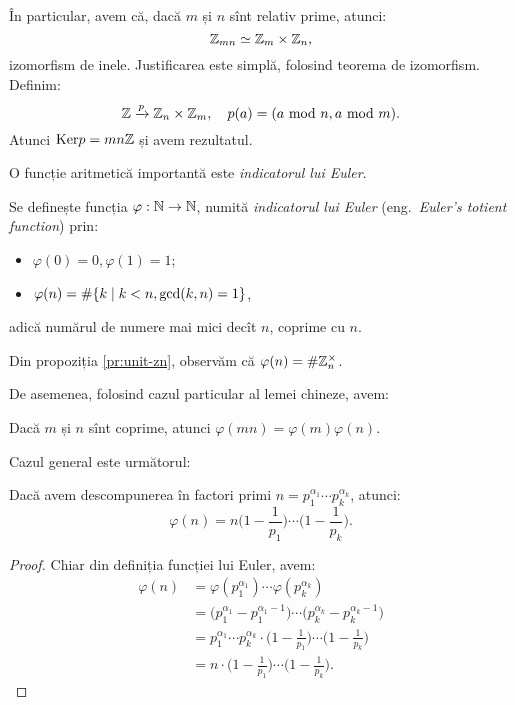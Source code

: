 În particular, avem că, dacă $ m $ și $ n $ sînt relativ prime, atunci:
\[
  \mathbb{Z}_{mn} \simeq \mathbb{Z}_m \times \mathbb{Z}_n,
\]
izomorfism de inele. Justificarea este simplă, folosind teorema de izomorfism.
Definim:
\[
  \ZZ \xrar{p} \ZZ_n \times \ZZ_m, \quad %
  p(a) = (a \text{ mod } n, a \text{ mod } m).
\]
Atunci $ \mathrm{Ker}p = mn\mathbb{Z} $ și avem rezultatul.

O funcție aritmetică importantă este \emph{indicatorul lui Euler}.
\begin{definition}\label{def:ind-euler}
  Se definește funcția $ \varphi: \mathbb{N} \to \mathbb{N} $, numită \emph{indicatorul lui Euler}
  (eng.\ \emph{Euler's totient function}) prin:
  \begin{itemize}
  \item $ \varphi(0) = 0, \varphi(1) = 1 $;
  \item $ \varphi(n) = \# \{ k \mid k < n, \mathrm{gcd}(k, n) = 1 \} $,
  \end{itemize}
  adică numărul de numere mai mici decît $ n $, coprime cu $ n $.
\end{definition}

Din propoziția \ref{pr:unit-zn}, observăm că $ \varphi(n) = \# \mathbb{Z}_n^\times $.

De asemenea, folosind cazul particular al lemei chineze, avem:
\begin{lemma}\label{le:phi-mn}
  Dacă $ m $ și $ n $ sînt coprime, atunci $ \varphi(mn) = \varphi(m) \varphi(n) $.
\end{lemma}

Cazul general este următorul:
\begin{theorem}\label{thm:phi-pk}
  Dacă avem descompunerea în factori primi $ n = p_1^{\alpha_1} \cdots p_k^{\alpha_k} $,
  atunci:
  \[
    \varphi(n) = n \Big( 1 - \frac{1}{p_1}\Big) \cdots \Big(1 - \frac{1}{p_k}\Big).    
  \]
\end{theorem}

\begin{proof}
  Chiar din definiția funcției lui Euler, avem:
  \begin{align*}
    \varphi(n) &= \varphi(p_1^{\alpha_1}) \cdots \varphi(p_k^{\alpha_k}) \\
               &= \big( p_1^{\alpha_1} - p_1^{\alpha_1 - 1}\big) \cdots %
                 \big( p_k^{\alpha_k} - p_k^{\alpha_k - 1}\big) \\
               &= p_1^{\alpha_1} \cdots p_k^{\alpha_k} \cdot \Big(1 - \frac{1}{p_1} \Big) %
                 \cdots \Big(1 - \frac{1}{p_k}\Big) \\
               &= n \cdot \Big(1 - \frac{1}{p_1} \Big) \cdots \Big(1 - \frac{1}{p_k}\Big).
  \end{align*}
\end{proof}

